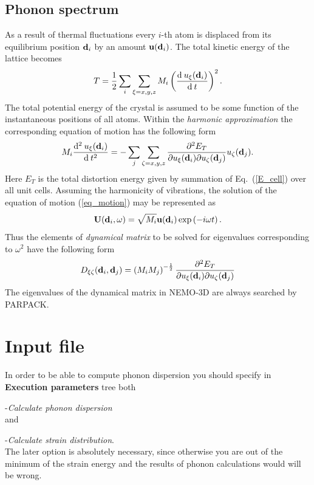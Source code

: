 \documentclass[12pt]{article}
\begin{document}
\subsection{Phonon spectrum}
As a result of thermal fluctuations every $i$-th atom is displaced
from its equilibrium position ${\bf d}_i$ by an amount ${\bf u}({\bf
d}_i)$. The total kinetic energy of the lattice becomes
\begin{equation}
\label{kin}
T=\frac{1}{2}\sum_i\sum_{\xi=x,y,z}M_i\left({\mathrm{d}\: u_\xi({\bf
  d}_i) \over \mathrm{d}\:t}\right)^2.
\end{equation}
The total potential energy of the crystal is assumed to be some
function of the instantaneous positions of all atoms. Within the
\emph{harmonic approximation} the corresponding equation of motion has
the following form
\begin{equation}
\label{eq_motion}
M_i{\mathrm{d}^2\: u_\xi({\bf d}_i) \over \mathrm{d}\:
  t^2}=-\sum_{j}\sum_{\zeta=x,y,z}{\partial^2 E_T \over \partial
  u_\xi({\bf d}_i)\partial u_\zeta({\bf d}_j)} u_\zeta({\bf d}_j).
\end{equation}
Here $E_T$ is the total distortion energy given by summation of
Eq.~(\ref{E_cell}) over all unit cells. Assuming the harmonicity of vibrations, the
solution of the equation of motion (\ref{eq_motion}) may be
represented as
\begin{equation}
\label{U_cluster}
{\bf U}({\bf d}_i,\omega)=\sqrt{M_i}{\bf u}({\bf
d}_i)\exp\left(-i\omega t\right).
\end{equation}
Thus the elements of \emph{dynamical matrix} to be solved for
eigenvalues corresponding to $\omega^2$ have the following form
\begin{equation}
\label{D_cluster}
D_{\xi \zeta}({\bf d}_i,{\bf d}_j)=\left(M_i
  M_j\right)^{-\frac{1}{2}}{\partial^2 E_T \over \partial u_\xi({\bf
  d}_i)\partial u_\zeta({\bf d}_j)}
\end{equation}
The eigenvalues of the dynamical matrix in NEMO-3D are always searched
by PARPACK.


\section{Input file}
In order to be able to compute phonon dispersion you should specify in
{\bf Execution parameters} tree both

-{\it Calculate phonon dispersion}\\
and

-{\it Calculate strain distribution}.\\
The later option is absolutely necessary, since otherwise you are
out of the minimum of the strain energy and the results of phonon
calculations would will be wrong.
\end{document}
